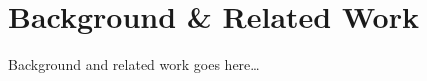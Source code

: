 \chapter{Background \& Related Work}\label{ch:background}
Background and related work goes here\dots
